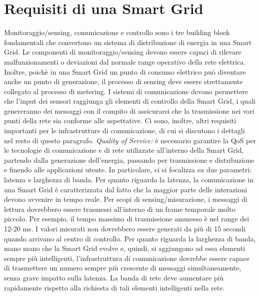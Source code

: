 \section{Requisiti di una Smart Grid}
Monitoraggio/sensing, comunicazione e controllo sono i tre building block fondamentali che convertono un sistema di distribuzione di energia in una Smart Grid. Le componenti di monitoraggio/sensing devono essere capaci di rilevare malfunzionamenti o deviazioni dal normale range operativo della rete elettrica. Inoltre, poichè in una Smart Grid un punto di consumo elettrico può diventare anche un punto di generazione, il processo di sensing deve essere strettamente collegato al processo di metering. \newline
I sistemi di comunicazione devono permettere che l'input dei sensori raggiunga gli elementi di controllo della Smart Grid, i quali genereranno dei messaggi con il compito di assicurarsi che la trasmissione nei vari punti della rete sia conforme alle aspettative. Ci sono, inoltre, altri requisiti importanti per le infrastrutture di comunicazione, di cui si discutono i dettagli nel resto di questo paragrafo.
\newline \newline
\textit{Quality of Service:} è necessario garantire la QoS per le tecnologie di comunicazione e di rete utilizzate all'interno della Smart Grid, partendo dalla generazione dell'energia, passando per trasmissione e distribuzione e finendo alle applicazioni utente. In particolare, ci si focalizza su due parametri: latenza e larghezza di banda.\newline
Per quanto riguarda la latenza, la comunicazione in una Smart Grid è caratterizzata dal fatto che la maggior parte delle interazioni devono avvenire in tempo reale. Per scopi di sensing/misurazione, i messaggi di lettura dovrebbero essere trasmessi all'interno di un frame temporale molto piccolo. Per esempio, il tempo massimo di trasmissione ammesso è nel range dei 12-20 ms. I valori misurati non dovrebbero essere generati da più di 15 secondi quando arrivano al centro di controllo. \newline
Per quanto riguarda la larghezza di banda, mano mano che la Smart Grid evolve e, quindi, si aggiungono ad essa elementi sempre più intelligenti, l'infrastruttura di comunicazione dovrebbe essere capace di trasmettere un numero sempre più crescente di messaggi simultaneamente, senza grave impatto sulla latenza. La banda di rete deve aumentare più rapidamente rispetto alla richiesta di tali elementi intelligenti nella rete.
